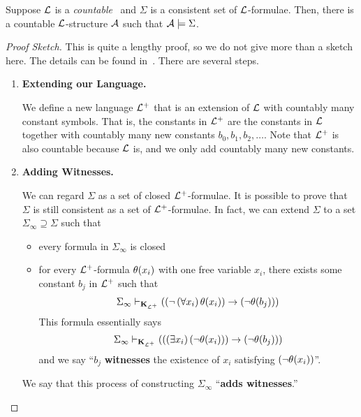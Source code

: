 \begin{boxtheorem}\label{Ch2:Thm:Model_Existence}
    Suppose $\mathcal{L}$ is a \textit{countable} \fola\ and $\Sigma$ is a consistent set of $\mathcal{L}$-formulae. Then, there is a countable $\mathcal{L}$-structure $\mathcal{A}$ such that $\mathcal{A} \models \Sigma$.
\end{boxtheorem}
\begin{proof}[Proof Sketch]
    This is quite a lengthy proof, so we do not give more than a sketch here. The details can be found in~\cite[Appendix A.2]{LecNotes2018}. There are several steps.

    \begin{enumerate}[label = \underline{\textbf{Step \arabic*.}}]
        \item \textbf{Extending our Language.}
        
        We define a new language $\mathcal{L}^+$ that is an extension of $\mathcal{L}$ with countably many constant symbols. That is, the constants in $\mathcal{L}^+$ are the constants in $\mathcal{L}$ together with countably many new constants $b_0, b_1, b_2, \ldots$. Note that $\mathcal{L}^+$ is also countable because $\mathcal{L}$ is, and we only add countably many new constants.
        
        \item \textbf{Adding Witnesses.}
        
        We can regard $\Sigma$ as a set of closed $\mathcal{L}^+$-formulae. It is possible to prove that $\Sigma$ is still consistent as a set of $\mathcal{L}^+$-formulae. In fact, we can extend $\Sigma$ to a set $\Sigma_{\infty} \supseteq \Sigma$ such that
        \begin{itemize}
            \item every formula in $\Sigma_{\infty}$ is closed
            \item for every $\mathcal{L}^+$-formula $\theta\!\left( x_i \right)$ with one free variable $x_i$, there exists some constant $b_j$ in $\mathcal{L}^+$ such that
            \begin{align*}
                \Sigma_{\infty} \vdash_{\mathbf{K}_{\mathcal{L}^+}}
                \left( 
                    \left( 
                        \neg\left( \forall x_i \right)\theta\!\left( x_i \right)
                     \right)
                    \to
                    \left( 
                        \neg \theta\!\left( b_j \right)
                     \right)
                 \right)
            \end{align*}
            This formula essentially says
            \begin{align*}
                \Sigma_{\infty} \vdash_{\mathbf{K}_{\mathcal{L}^+}}
                \left( 
                    \left( 
                        \left( \exists x_i \right)\left( \neg\theta\!\left( x_i \right) \right)
                     \right)
                    \to
                    \left( 
                        \neg \theta\!\left( b_j \right)
                     \right)
                 \right)
            \end{align*}
            and we say ``$b_j$ \textbf{witnesses} the existence of $x_i$ satisfying $\left( \neg\theta\!\left( x_i \right) \right)$''.
        \end{itemize}
        We say that this process of constructing $\Sigma_{\infty}$ ``\textbf{adds witnesses}.''


\end{enumerate}
\end{proof}
